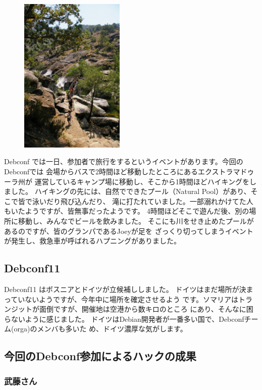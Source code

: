 \documentclass[mingoth,a4paper]{jsarticle}
\begin{document}
\begin{figure}
\includegraphics[width=5cm]{image200908/debconf9_daytrip.jpg}
\end{figure}

Debconf では一日、参加者で旅行をするというイベントがあります。今回の
Debconfでは 会場からバスで2時間ほど移動したところにあるエクストラマドゥーラ州が
運営しているキャンプ場に移動し、そこから1時間ほどハイキングをしました。
ハイキングの先には、自然でできたプール（Natural Pool）があり、そこで皆で泳いだり飛び込んだり、
滝に打たれていました。一部溺れかけてた人もいたようですが、皆無事だったようです。
4時間ほどそこで遊んだ後、別の場所に移動し、みんなでビールを飲みました。
そこにも川をせき止めたプールがあるのですが、皆のグランパであるJoeyが足を
ざっくり切ってしまうイベントが発生し、救急車が呼ばれるハプニングがありました。

\subsection{Debconf11}
Debconf11 はボスニアとドイツが立候補ししました。
ドイツはまだ場所が決まっていないようですが、今年中に場所を確定させるよう
です。ソマリアはトランジットが面倒ですが、開催地は空港から数キロのところ
にあり、そんなに困らないように感じました。
ドイツはDebian開発者が一番多い国で、Debconfチーム(orga)のメンバも多いた
め、ドイツ濃厚な気がします。

\subsection{今回のDebconf参加によるハックの成果}
\subsubsection{武藤さん}
\end{document}
